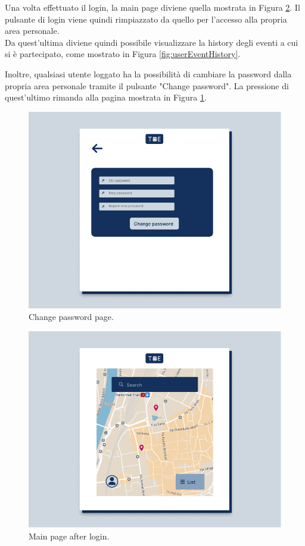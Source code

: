 \documentclass[9pt]{extarticle}
\begin{document}
Una volta effettuato il login, la main page diviene quella mostrata in Figura \ref{fig:seeAvailableLocations}. Il pulsante di login viene quindi rimpiazzato da quello per l'accesso alla propria area personale.\\
Da quest'ultima diviene quindi possibile visualizzare la history degli eventi a cui si è partecipato, come mostrato in Figura \ref{fig:userEventHistory}.

Inoltre, qualsiasi utente loggato ha la possibilità di cambiare la password dalla propria area personale tramite il pulsante "Change password". La pressione di quest'ultimo rimanda alla pagina mostrata in Figura \ref{fig:ChangePwd}.

\newpage

\begin{figure}[!htb]
	\centering
	\includegraphics[width=.7\linewidth]{./images/ChangePwd.pdf}
	\caption{Change password page.}
	\label{fig:ChangePwd}
\end{figure}

\begin{figure}[!htb]
	\centering
	\includegraphics[width=.7\linewidth]{./images/SeeAvailableLocations.pdf}
	\caption{Main page after login.}
	\label{fig:seeAvailableLocations}
\end{figure}
\end{document}
